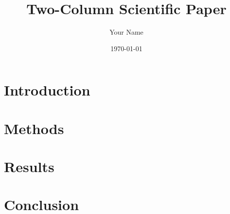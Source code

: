 \documentclass[twocolumn]{article}
\begin{document}
\title{Two-Column Scientific Paper}
\author{Your Name}
\date{\today}
\maketitle

\section{Introduction}
\lipsum[1]

\section{Methods}
\lipsum[2]

\section{Results}
\lipsum[3]

\section{Conclusion}
\lipsum[4]
\end{document}
